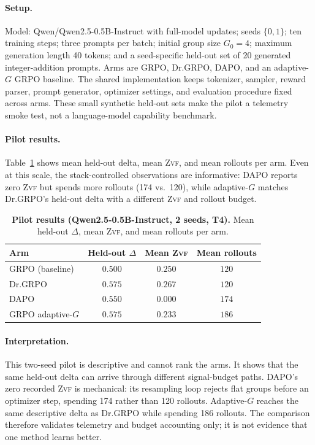 \documentclass[11pt]{article}
\newcommand{\zvf}{\textsc{Zvf}}
\newcommand{\grpo}{\textsc{GRPO}}
\begin{document}
\paragraph{Setup.} Model: Qwen/Qwen2.5-0.5B-Instruct with full-model updates;
seeds $\{0,1\}$; ten training steps; three prompts per batch; initial group size
$G_0=4$; maximum generation length 40 tokens; and a seed-specific held-out set
of 20 generated integer-addition prompts. Arms are GRPO, Dr.\grpo{}, DAPO, and
an adaptive-$G$ GRPO baseline. The shared implementation keeps tokenizer,
sampler, reward parser, prompt generator, optimizer settings, and evaluation
procedure fixed across arms. These small synthetic held-out sets make the
pilot a telemetry smoke test, not a language-model capability benchmark.

\paragraph{Pilot results.} Table~\ref{tab:pilot} shows mean held-out delta,
mean \zvf{}, and mean rollouts per arm. Even at this scale, the stack-controlled
observations are informative: DAPO reports zero \zvf{} but spends more rollouts
(174 vs.\ 120), while adaptive-$G$ matches Dr.\grpo{}'s held-out delta with a
different \zvf{} and rollout budget.

\begin{table}[t]
\centering
\caption{\textbf{Pilot results (Qwen2.5-0.5B-Instruct, 2 seeds, T4).} Mean
  held-out $\Delta$, mean \zvf{}, and mean rollouts per arm.}
\label{tab:pilot}
\small
\begin{tabular}{@{}lccc@{}}
\toprule
\textbf{Arm} & \textbf{Held-out $\Delta$} & \textbf{Mean \zvf{}} &
\textbf{Mean rollouts}\\
\midrule
GRPO (baseline)          & $0.500$ & $0.250$ & $120$ \\
Dr.\grpo{}                & $0.575$ & $0.267$ & $120$ \\
DAPO                     & $0.550$ & $0.000$ & $174$ \\
GRPO adaptive-$G$        & $0.575$ & $0.233$ & $186$ \\
\bottomrule
\end{tabular}
\end{table}

\paragraph{Interpretation.} This two-seed pilot is descriptive and cannot rank
the arms. It shows that the same held-out delta can arrive through different
signal-budget paths. DAPO's zero recorded \zvf{} is mechanical: its resampling
loop rejects flat groups before an optimizer step, spending 174 rather than 120
rollouts. Adaptive-$G$ reaches the same descriptive delta as Dr.\grpo{} while
spending 186 rollouts. The comparison therefore validates telemetry and budget
accounting only; it is not evidence that one method learns better.
\end{document}
